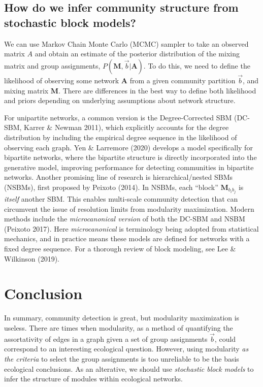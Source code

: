\documentclass[
]{article}
\begin{document}
\hypertarget{how-do-we-infer-community-structure-from-stochastic-block-models}{%
\subsection{How do we infer community structure from stochastic block
models?}\label{how-do-we-infer-community-structure-from-stochastic-block-models}}

We can use Markov Chain Monte Carlo (MCMC) sampler to take an observed
matrix \(A\) and obtain an estimate of the posterior distribution of the
mixing matrix and group assignments,
\(P(\mathbf{M}, \vec{b} | \mathbf{A})\). To do this, we need to define
the likelihood of observing some network \(\mathbf{A}\) from a given
community partition \(\vec{b}\), and mixing matrix \(\mathbf{M}\). There
are differences in the best way to define both likelihood and priors
depending on underlying assumptions about network structure.

For unipartite networks, a common version is the Degree-Corrected SBM
(DC-SBM, Karrer \& Newman 2011), which explicitly accounts for the
degree distribution by including the empirical degree sequence in the
likelihood of observing each graph. Yen \& Larremore (2020) develops a
model specifically for bipartite networks, where the bipartite structure
is directly incorporated into the generative model, improving
performance for detecting communities in bipartite networks. Another
promising line of research is hierarchical/nested SBMs (NSBMs), first
proposed by Peixoto (2014). In NSBMs, each ``block''
\(\mathbf{M}_{b_i b_j}\) is \emph{itself} another SBM. This enables
multi-scale community detection that can circumvent the issue of
resolution limits from modularity maximization. Modern methods include
the \emph{microcanonical version} of both the DC-SBM and NSBM (Peixoto
2017). Here \emph{microcanonical} is terminology being adopted from
statistical mechanics, and in practice means these models are defined
for networks with a fixed degree sequence. For a thorough review of
block modeling, see Lee \& Wilkinson (2019).

\hypertarget{conclusion}{%
\section{Conclusion}\label{conclusion}}

In summary, community detection is great, but modularity maximization is
useless. There are times when modularity, as a method of quantifying the
assortativity of edges in a graph given a set of group assignments
\(\vec{b}\), could correspond to an interesting ecological question.
However, using modularity \emph{as the criteria} to select the group
assignments is too unreliable to be the basis ecological conclusions. As
an alterative, we should use \emph{stochastic block models} to infer the
structure of modules within ecological networks.
\end{document}
